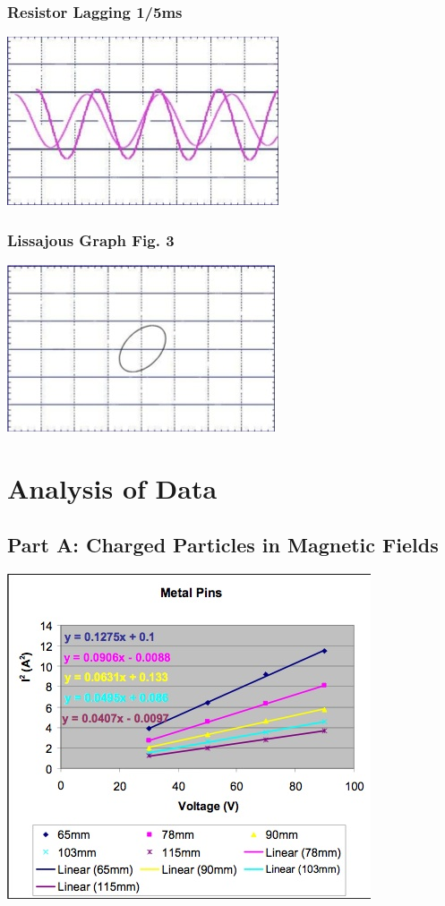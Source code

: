 \documentclass[titlepage]{article}
\begin{document}
\subsubsection{Resistor Lagging 1/5ms}\label{ssub:resistor_lagging_1_5ms}
\includegraphics{3.jpg}

\subsubsection{Lissajous Graph Fig. 3}\label{ssub:lissajous_graph_fig_3}
\includegraphics{4.jpg}

\section{Analysis of Data}\label{sec:analysis_of_data}
\subsection{Part A: Charged Particles in Magnetic Fields}\label{sub:part_a_charged_particles_in_magnetic_fields-aod}
\begin{center}\label{gph1}
	\includegraphics{5.jpg}
\end{center}
\end{document}
